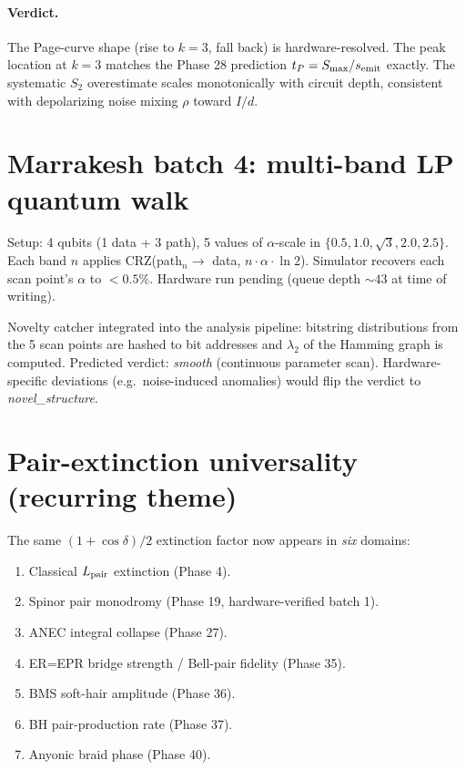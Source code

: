 \documentclass[11pt,a4paper]{article}
\begin{document}
\paragraph{Verdict.} The Page-curve shape (rise to $k=3$, fall back) is
hardware-resolved. The peak location at $k=3$ matches the Phase 28
prediction $t_P = S_{\max}/s_{\rm emit}$ exactly. The systematic
$S_2$ overestimate scales monotonically with circuit depth, consistent
with depolarizing noise mixing $\rho$ toward $I/d$.

\section{Marrakesh batch 4: multi-band LP quantum walk}

Setup: 4 qubits (1 data + 3 path), 5 values of $\alpha$-scale in
$\{0.5, 1.0, \sqrt{3}, 2.0, 2.5\}$. Each band $n$ applies
CRZ(path$_n \to$ data, $n \cdot \alpha \cdot \ln 2$). Simulator
recovers each scan point's $\alpha$ to $<0.5\%$. Hardware run
pending (queue depth $\sim 43$ at time of writing).

Novelty catcher integrated into the analysis pipeline: bitstring
distributions from the 5 scan points are hashed to bit addresses and
$\lambda_2$ of the Hamming graph is computed. Predicted verdict:
\textit{smooth} (continuous parameter scan). Hardware-specific
deviations (e.g.\ noise-induced anomalies) would flip the verdict to
\textit{novel\_structure}.

\section{Pair-extinction universality (recurring theme)}

The same $(1 + \cos \delta)/2$ extinction factor now appears in
\emph{six} domains:
\begin{enumerate}
\item Classical $L_{\rm pair}$ extinction (Phase 4).
\item Spinor pair monodromy (Phase 19, hardware-verified batch 1).
\item ANEC integral collapse (Phase 27).
\item ER=EPR bridge strength / Bell-pair fidelity (Phase 35).
\item BMS soft-hair amplitude (Phase 36).
\item BH pair-production rate (Phase 37).
\item Anyonic braid phase (Phase 40).
\end{enumerate}
\end{document}
